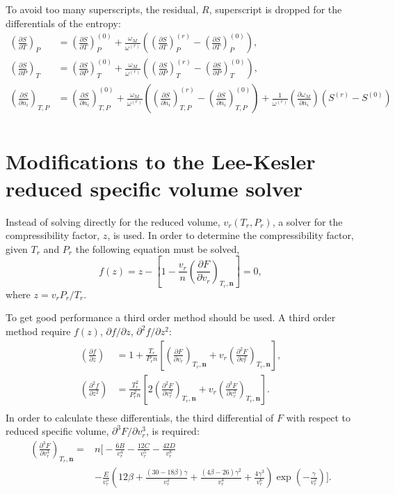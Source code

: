 \documentclass[english]{../thermomemo/thermomemo}
\numberwithin{equation}{section}
\newcommand*{\pder}[2]{\left(\frac{\partial #1}{\partial #2}\right)}
\newcommand*{\pdder}[2]{\left(\frac{\partial^2 #1}{\partial
      #2^2}\right)}
\newcommand*{\pddder}[2]{\left(\frac{\partial^3 #1}{\partial #2^3}\right)}
\begin{document}
To avoid too many superscripts, the residual, $R$, superscript is
dropped for the differentials of the entropy:
\begin{align}
\label{eq:LK_entropy_diff}
\pder{S}{T}_{P} &= \pder{S}{T}_{P}^{(0)} +
\frac{\omega_M}{\omega^{(r)}}\left(\pder{S}{T}_{P}^{(r)} -
\pder{S}{T}_{P}^{(0)}\right), \\
\pder{S}{P}_{T} &= \pder{S}{P}_{T}^{(0)} +
\frac{\omega_M}{\omega^{(r)}}\left(\pder{S}{P}_{T}^{(r)} -
\pder{S}{P}_{T}^{(0)}\right), \\
\pder{S}{n_i}_{T,P} &= \pder{S}{n_i}_{T,P}^{(0)} +
\frac{\omega_M}{\omega^{(r)}}\left(\pder{S}{n_i}_{T,P}^{(r)} -
\pder{S}{n_i}_{T,P}^{(0)}\right) +
\frac{1}{\omega^{(r)}}\pder{\omega_M}{n_i}\left(S^{(r)} - S^{(0)}\right)\\
\end{align}

\section{Modifications to the Lee-Kesler reduced specific volume solver}
Instead of solving directly for the reduced volume, $v_r(T_r,P_r)$, a solver
for the compressibility factor, $z$, is used. In order to determine the
compressibility factor, given $T_r$ and $P_r$ the following equation
must be solved,
\begin{equation}
\label{eq:LK_z_fun}
f(z) = z - \left[1 - \frac{v_r}{n} \left( \frac{\partial F}{\partial v_r} \right)_{T_r, \textbf{n}} \right] = 0,
\end{equation}
where $z=v_rP_r/T_r$.

To get good performance a third order method should be used. A third
order method require $f(z)$, $\partial f/ \partial z$, $\partial^2
f / \partial z^2$:
\begin{align}
\label{eq:LK_z_fun_diff}
\pder{f}{z} &= 1 + \frac{T_r}{P_r n} \left[\pder{F}{v_r}_{T_r, \textbf{n}} + v_r\pdder{F}{v_r}_{T_r, \textbf{n}}\right],\\
\pdder{f}{z} &= \frac{T_r^2}{P_r^2 n} \left[2\pdder{F}{v_r}_{T_r,
    \textbf{n}} + v_r \pddder{F}{v_r}_{T_r, \textbf{n}}\right].\\
\end{align}
In order to calculate these differentials, the third differential of
$F$ with respect to reduced specific volume, $\partial^3
F/ \partial v_r^3$, is required:
\begin{align}
\label{eq:LK_FDiff3vr}
\pddder{F}{v_r}_{T_r, \textbf{n}} =& n \bigg[-\frac{6B}{v_r^4} - \frac{12C}{v_r^5} - \frac{42D}{v_r^8} \\
  & - \frac{E}{v_r^5} \left(12\beta + \frac{(30 - 18\beta)\gamma}{v_r^2} + \frac{\left(4\beta-26\right)\gamma^2}{v_r^4} + \frac{4\gamma^3}{v_r^6} \right) \exp \left(-\frac{\gamma}{v_r^2} \right)\bigg]. \\
\end{align}
\end{document}
